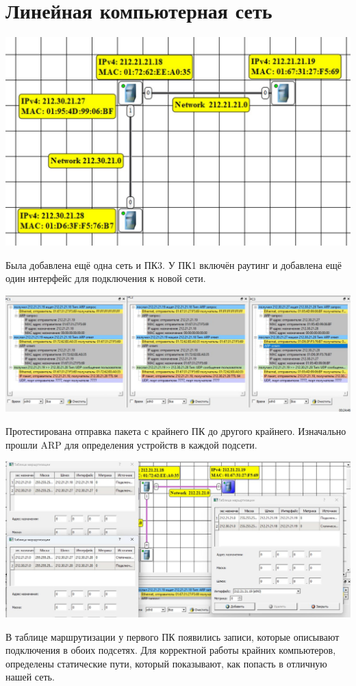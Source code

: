 \documentclass{article}
\begin{document}
\section{Линейная компьютерная сеть}
\begin{center}
    \includegraphics[width=.9\textwidth]{5}
\end{center}
Была добавлена ещё одна сеть и ПК3. У ПК1 включён раутинг и добавлена ещё один интерфейс для подключения к новой сети.

\begin{center}
    \includegraphics[width=.9\textwidth]{6}
\end{center}
Протестирована отправка пакета с крайнего ПК до другого крайнего. Изначально прошли ARP для определения устройств в каждой подсети.

\begin{center}
    \includegraphics[width=.9\textwidth]{7}
\end{center}
В таблице маршрутизации у первого ПК появились записи, которые описывают подключения в обоих подсетях. 
Для корректной работы крайних компьютеров, определены статические пути, который показывают, как попасть в отличную нашей сеть. 
\end{document}
